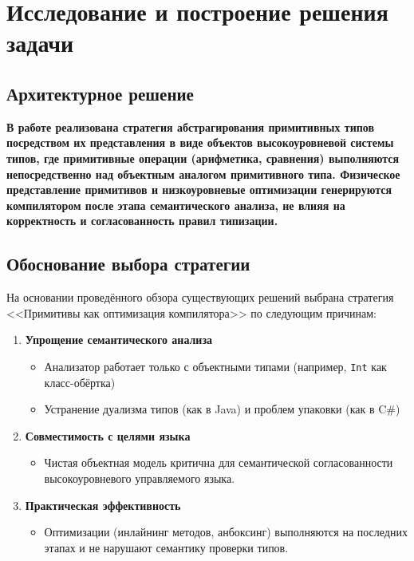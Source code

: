\section{Исследование и построение решения задачи}
\label{sec:Chapter3} 
\subsection{Архитектурное решение}

\textbf{В работе реализована стратегия абстрагирования примитивных типов посредством их представления в виде объектов высокоуровневой системы типов, где примитивные операции (арифметика, сравнения) выполняются непосредственно над объектным аналогом примитивного типа. Физическое представление примитивов и низкоуровневые оптимизации генерируются компилятором после этапа семантического анализа, не влияя на корректность и согласованность правил типизации.}

\subsection{Обоснование выбора стратегии}
На основании проведённого обзора существующих решений выбрана стратегия <<Примитивы как оптимизация компилятора>> по следующим причинам:

\begin{enumerate}
    \item \textbf{Упрощение семантического анализа}
    \begin{itemize}[label={--}]
        \item Анализатор работает только с объектными типами (например, \texttt{Int} как класс-обёртка)
        \item Устранение дуализма типов (как в Java) и проблем упаковки (как в C\#)
    \end{itemize}

    \item \textbf{Совместимость с целями языка}
    \begin{itemize}[label={--}]
        \item Чистая объектная модель критична для семантической согласованности высокоуровневого управляемого языка.
    \end{itemize}

    \item \textbf{Практическая эффективность}
    \begin{itemize}[label={--}]
        \item Оптимизации (инлайнинг методов, анбоксинг) выполняются на последних этапах и не нарушают семантику проверки типов.
    \end{itemize}
\end{enumerate}

